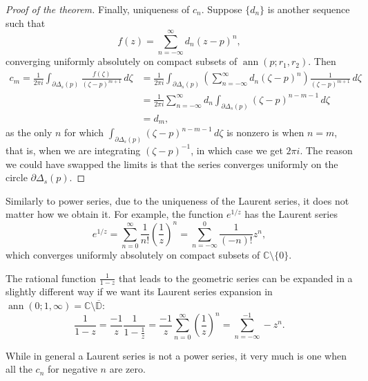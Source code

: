 \documentclass[12pt,openany]{book}
\newcommand{\ann}{\operatorname{ann}}
\newcommand{\C}{{\mathbb{C}}}
\newcommand{\D}{{\mathbb{D}}}
\theoremstyle{plain}
\theoremstyle{remark}
\theoremstyle{definition}
\theoremstyle{exercise}
\theoremstyle{example}
\begin{document}
\begin{proof}[Proof of the theorem]
Finally, uniqueness of $c_n$.  Suppose $\{ d_n \}$ is another sequence such
that
\begin{equation*}
f(z)
=
\sum_{n=-\infty}^{\infty} d_n {(z-p)}^{n} ,
\end{equation*}
converging uniformly absolutely on compact subsets of $\ann(p;r_1,r_2)$.
Then
\begin{equation*}
\begin{split}
c_m = \frac{1}{2\pi i}
\int_{\partial \Delta_{s}(p)} \frac{f(\zeta)}{{(\zeta-p)}^{m+1}}
 \, d\zeta 
& =
\frac{1}{2\pi i}
\int_{\partial \Delta_{s}(p)}
\left(\sum_{n=-\infty}^{\infty} d_n {(\zeta-p)}^{n} \right)
\frac{1}{{(\zeta-p)}^{m+1}}
 \, d\zeta 
\\
& =
\frac{1}{2\pi i}
\sum_{n=-\infty}^{\infty}
d_n
\int_{\partial \Delta_{s}(p)}
{(\zeta-p)}^{n-m-1}
 \, d\zeta 
\\
& =
d_m ,
\end{split}
\end{equation*}
as the only $n$ for which
$\int_{\partial \Delta_{s}(p)}
{(\zeta-p)}^{n-m-1}
 \, d\zeta$ is nonzero is when $n=m$, that is, when we are integrating
${(\zeta-p)}^{-1}$, in which case we get $2 \pi i$.
The reason we could have swapped the limits is that the series
converges uniformly on the circle $\partial \Delta_s(p)$.
\end{proof}

Similarly to power series, due to the uniqueness of the Laurent series,
it does not matter how we obtain it.  For example, the function $e^{1/z}$
has the Laurent series
\begin{equation*}
e^{1/z}
=
\sum_{n=0}^{\infty} \frac{1}{n!} {\left(\frac{1}{z}\right)}^n
=
\sum_{n=-\infty}^0 \frac{1}{(-n)!} z^n ,
\end{equation*}
which converges uniformly absolutely on compact subsets of
$\C \setminus \{ 0 \}$.

The rational function $\frac{1}{1-z}$ that leads to the geometric series can
be expanded in a slightly different way if we want its Laurent series
expansion in $\ann(0;1,\infty) = \C \setminus \overline{\D}$:
\begin{equation*}
\frac{1}{1-z}
=
\frac{-1}{z}
\frac{1}{1-\frac{1}{z}}
=
\frac{-1}{z}
\sum_{n=0}^\infty
{\left(\frac{1}{z}\right)}^n
=
\sum_{n=-\infty}^{-1}
- z^{n} .
\end{equation*}

While in general a Laurent series is not a power series,
it very much is one when all the $c_n$ for negative $n$ are zero.
\end{document}
